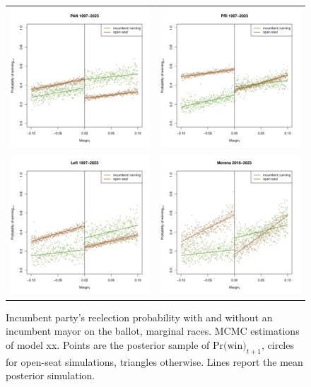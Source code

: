 \documentclass[letter,12pt]{article}
\begin{document}
\begin{figure}
  \centering
    \caption{Incumbent party's reelection probability with and without an incumbent mayor on the ballot, marginal races. MCMC estimations of model xx. Points are the posterior sample of $\text{Pr(win)}_{t+1}$, circles for open-seat simulations, triangles otherwise. Lines report the mean posterior simulation.}\label{F:luro}
    \begin{tabular}{cc}
    \includegraphics[width=.45\columnwidth]{../plots/pan-97-23-mcmc.pdf} &
    \includegraphics[width=.45\columnwidth]{../plots/pri-97-23-mcmc.pdf} \\
    \includegraphics[width=.45\columnwidth]{../plots/left-97-23-mcmc.pdf} &
    \includegraphics[width=.45\columnwidth]{../plots/left-18-23-mcmc.pdf} \\
    \end{tabular}
  \end{figure}
\end{document}
